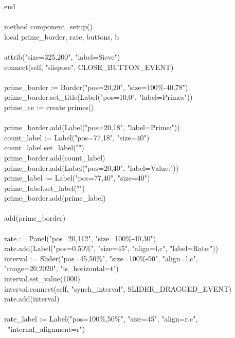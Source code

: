 {\>end \\
\ \\
\>method component\_setup() \\
\>\>local prime\_border, rate, buttons, b \\
\ \\
\>\>attrib("size=325,200", "label=Sieve") \\
\>\>connect(self, "dispose", CLOSE\_BUTTON\_EVENT) \\
\ \\
\>\>prime\_border := Border("pos=20,20", "size=100\%-40,78") \\
\>\>prime\_border.set\_title(Label("pos=10,0", "label=Primes")) \\
\>\>prime\_ce := create primes() \\
\ \\
\>\>prime\_border.add(Label("pos=20,18", "label=Prime:")) \\
\>\>count\_label := Label("pos=77,18", "size=40") \\
\>\>count\_label.set\_label("") \\
\>\>prime\_border.add(count\_label) \\
\>\>prime\_border.add(Label("pos=20,40", "label=Value:")) \\
\>\>prime\_label := Label("pos=77,40", "size=40") \\
\>\>prime\_label.set\_label("") \\
\>\>prime\_border.add(prime\_label) \\
\ \\
\>\>add(prime\_border) \\
\ \\
\>\>rate := Panel("pos=20,112", "size=100\%-40,30") \\
\>\>rate.add(Label("pos=0,50\%", "size=45", "align=l,c", "label=Rate:")) \\
\>\>interval := Slider("pos=45,50\%", "size=100\%-90", "align=l,c", \\
\>\>\>\>\>\>\>"range=20,2020", "is\_horizontal=t") \\
\>\>interval.set\_value(1000) \\
\>\>interval.connect(self, "synch\_interval", SLIDER\_DRAGGED\_EVENT) \\
\>\>rate.add(interval) \\
\ \\
\>\>rate\_label := Label("pos=100\%,50\%", "size=45", "align=r,c", \\
\>\>\>\>\>\>\>\>\ "internal\_alignment=r") \\
}
